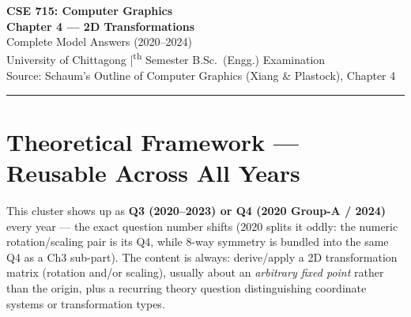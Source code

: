 \documentclass[12pt, a4paper]{article}
\begin{document}

\begin{center}
  {\LARGE\bfseries\color{sectionblue} CSE 715: Computer Graphics}\\[0.6em]
  {\Large\bfseries Chapter 4 --- 2D Transformations}\\[0.3em]
  {\large Complete Model Answers (2020--2024)}\\[0.2em]
  {\normalsize University of Chittagong \quad|\textsuperscript{th} Semester B.Sc.\ (Engg.) Examination}\\[0.3em]
  {\small Source: Schaum's Outline of Computer Graphics (Xiang \& Plastock), Chapter 4}
\end{center}

\vspace{0.3em}
\noindent\rule{\linewidth}{1pt}
\vspace{0.5em}

\tableofcontents
\newpage

\section{Theoretical Framework --- Reusable Across All Years}
This cluster shows up as \textbf{Q3 (2020--2023) or Q4 (2020 Group-A / 2024)} every year --- the exact question number shifts (2020 splits it oddly: the numeric rotation/scaling pair is its Q4, while 8-way symmetry is bundled into the same Q4 as a Ch3 sub-part). The content is always: derive/apply a 2D transformation matrix (rotation and/or scaling), usually about an \emph{arbitrary fixed point} rather than the origin, plus a recurring theory question distinguishing coordinate systems or transformation types.

\end{document}
